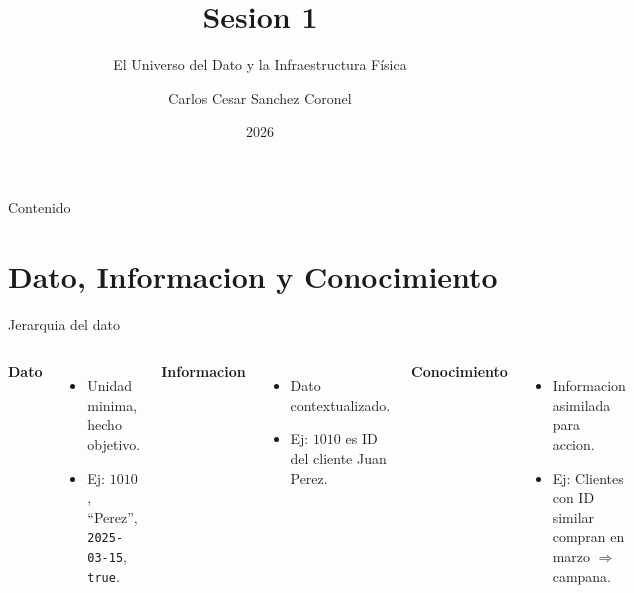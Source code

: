 \documentclass[aspectratio=169, 10pt, xcolor=table]{beamer}
\title[SESION 1 BBDD]{\textbf{Sesion 1}}
\subtitle{El Universo del Dato y la Infraestructura Física}
\author[Prof. C. Sanchez]{Carlos Cesar Sanchez Coronel}
\institute{\textbf{BASES DE DATOS}}
\date{2026}
\begin{document}
\begin{frame}
    \titlepage
\end{frame}

\begin{frame}{Contenido}
    \tableofcontents
\end{frame}

\section{Dato, Informacion y Conocimiento}

\begin{frame}{Jerarquia del dato}
    \begin{columns}[t]
        \textbf{Dato}
        \begin{itemize}
            \item Unidad minima, hecho objetivo.
            \item Ej: $1010$, ``Perez'', \texttt{2025-03-15}, \texttt{true}.
        \end{itemize}
        \textbf{Informacion}
        \begin{itemize}
            \item Dato contextualizado.
            \item Ej: $1010$ es ID del cliente Juan Perez.
        \end{itemize}
        \textbf{Conocimiento}
        \begin{itemize}
            \item Informacion asimilada para accion.
            \item Ej: Clientes con ID similar compran en marzo $\Rightarrow$ campana.
        \end{itemize}
    \end{columns}
    \vspace{0.3cm}
    \centering
\end{frame}
\end{document}
